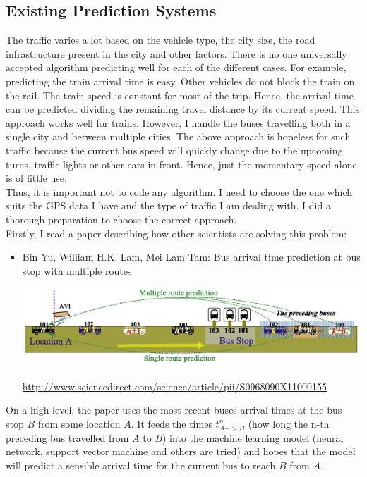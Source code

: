 \documentclass[12pt,a4paper,oneside,openright]{report}
\begin{document}
\subsection{Existing Prediction Systems}

The traffic varies a lot based on the vehicle type, the city size, the road
infrastructure present in the city and other factors. There is no one universally
accepted algorithm predicting well for each of the different cases. For example, predicting
the train arrival time is easy. Other vehicles do not block the train on the rail. The train
speed is constant for most of the trip. Hence, the arrival time can be predicted dividing the
remaining travel distance by its current speed. This approach works well for trains. However,
I handle the buses travelling both in a single city and between multiple cities. The above
approach is hopeless for such traffic because the current bus speed will quickly
change due to the upcoming turns, traffic lights or other cars in front. Hence, just the
momentary speed alone is of little use. \\

Thus, it is important not to code any algorithm. I need to choose the one which suits
the GPS data I have and the type of traffic I am dealing with. I did a thorough preparation
to choose the correct approach. \\

Firstly, I read a paper describing how other scientists are solving this problem:

\begin{itemize}

\item Bin Yu, William H.K. Lam, Mei Lam Tam: Bus arrival time prediction at
bus stop with multiple routes 

\includegraphics[width=\textwidth]{figs/paper.png}

\textcolor{blue}{\url{http://www.sciencedirect.com/science/article/pii/S0968090X11000155}}

\end{itemize}

On a high level, the paper uses the most recent buses arrival times at the bus stop $B$
from some location $A$. It feeds the times $t^{n}_{A->B}$ (how long the n-th
preceding bus travelled from $A$ to $B$) into the machine learning model (neural network,
support vector machine and others are tried) and hopes that the model will predict a
sensible arrival time for the current bus to reach $B$ from $A$. \\
\end{document}

